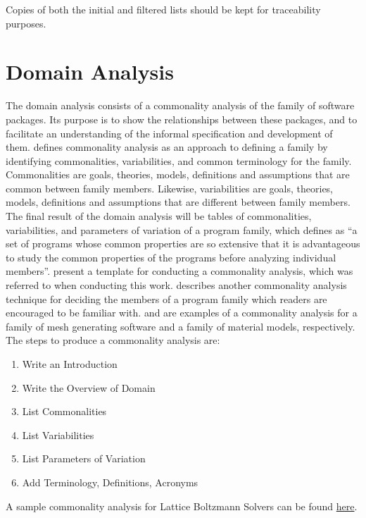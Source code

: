 \documentclass[letterpaper,cleveref]{lipics-v2019}
\theoremstyle{definition}
\begin{document}
Copies of both the initial and filtered lists should be kept for traceability purposes.

\section{Domain Analysis} \label{SecDomainAnalysis}

The domain analysis consists of a commonality analysis of the family of software packages. Its purpose is to show the relationships between these packages, and to facilitate an understanding of the informal specification and development of them. \cite{weiss1997defining} defines commonality analysis as an approach to defining a family by identifying commonalities, variabilities, and common terminology for the family. Commonalities are goals, theories, models, definitions and assumptions that are common between family members. Likewise, variabilities are goals, theories, models, definitions and assumptions that are different between family members. The final result of the domain analysis will be tables of commonalities, variabilities, and parameters of variation of a program family, which \cite{parnas1976design} defines as ``a set of programs whose common properties are so extensive that it is advantageous to study the common properties of the programs before analyzing individual members''. \cite{smith2008commonality} present a template for conducting a commonality analysis, which was referred to when conducting this work. \cite{weiss1998commonality} describes another commonality analysis technique for deciding the members of a program family which readers are encouraged to be familiar with. \cite{SmithAndChen2004} and \cite{SmithMcCutchanAndCarette2017} are examples of a commonality analysis for a family of mesh generating software and a family of material models, respectively. The steps to produce a commonality analysis are:

\begin{enumerate}
\item Write an Introduction
\item Write the Overview of Domain
\item List Commonalities
\item List Variabilities
\item List Parameters of Variation
\item Add Terminology, Definitions, Acronyms
\end{enumerate}

A sample commonality analysis for Lattice Boltzmann Solvers can be found
\href{https://github.com/smiths/AIMSS/blob/master/StateOfPractice/Peter-Notes/Commonality-Analysis-LB-Systems.pdf}{here}.
\end{document}
